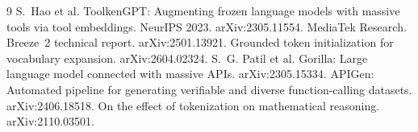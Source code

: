\documentclass[11pt]{article}
\begin{document}
\begin{thebibliography}{9}
 S.~Hao et al. ToolkenGPT: Augmenting frozen language
models with massive tools via tool embeddings. NeurIPS 2023. arXiv:2305.11554.
 MediaTek Research. Breeze~2 technical report.
arXiv:2501.13921.
 Grounded token initialization for vocabulary expansion.
arXiv:2604.02324.
 S.~G. Patil et al. Gorilla: Large language model connected
with massive APIs. arXiv:2305.15334.
 APIGen: Automated pipeline for generating verifiable and
diverse function-calling datasets. arXiv:2406.18518.
 On the effect of tokenization on mathematical
reasoning. arXiv:2110.03501.
\end{thebibliography}
\end{document}
